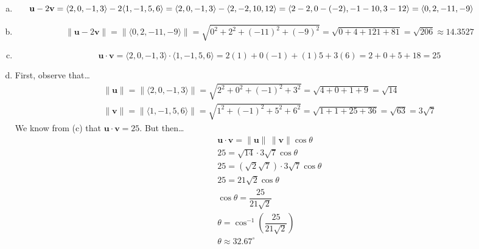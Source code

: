 \documentclass[11pt,letterpaper]{article}
\begin{document}
\sol 
\begin{enumerate}[(a)]
\item 
	\[
	\hspace{-1.5cm} \mathbf{u} - 2 \mathbf{v}= \langle 2, 0, -1, 3 \rangle - 2 \langle 1, -1, 5, 6 \rangle= \langle 2, 0, -1, 3 \rangle - \langle 2, -2, 10, 12 \rangle= \langle 2 - 2, 0 - (-2), -1 - 10, 3 - 12 \rangle= \langle 0, 2, -11, -9 \rangle
	\] \pspace

\item 
	\[
	\| \mathbf{u} - 2\mathbf{v} \|= \| \langle 0, 2, -11, -9 \rangle \|= \sqrt{0^2 + 2^2 + (-11)^2 + (-9)^2}= \sqrt{0 + 4 + 121 + 81}= \sqrt{206} \approx 14.3527
	\] \pspace

\item 
	\[
	\mathbf{u} \cdot \mathbf{v}= \langle 2, 0, -1, 3 \rangle \cdot \langle 1, -1, 5, 6 \rangle= 2(1) + 0(-1) + (1)5 + 3(6)= 2 + 0 + 5 + 18= 25
	\] \pspace

\item First, observe that\dots
	\[
	\begin{aligned}
	\| \mathbf{u} \|= \| \langle 2, 0, -1, 3 \rangle \|= \sqrt{2^2 + 0^2 + (-1)^2 + 3^2}= \sqrt{4 + 0 + 1 + 9}= \sqrt{14} \\
	\| \mathbf{v} \|= \| \langle 1, -1, 5, 6 \rangle \|= \sqrt{1^2 + (-1)^2 + 5^2 + 6^2}= \sqrt{1 + 1 + 25 + 36}= \sqrt{63}= 3 \sqrt{7}
	\end{aligned}
	\]
We know from (c) that $\mathbf{u} \cdot \mathbf{v}= 25$. But then\dots
	\[
	\begin{gathered}
	\mathbf{u} \cdot \mathbf{v}= \| \mathbf{u} \| \, \| \mathbf{v} \| \cos \theta \\[0.3cm]
	25= \sqrt{14} \cdot 3 \sqrt{7} \cos \theta \\[0.3cm]
	25= (\sqrt{2} \sqrt{7}) \cdot 3 \sqrt{7} \cos \theta \\[0.3cm]
	25= 21 \sqrt{2} \cos \theta \\[0.3cm]
	\cos \theta= \dfrac{25}{21 \sqrt{2}} \\[0.3cm]
	\theta= \cos^{-1} \left( \dfrac{25}{21 \sqrt{2}} \right) \\[0.3cm]
	\theta \approx 32.67^\circ
	\end{gathered}
	\]
\end{enumerate}



\newpage
\end{document}
